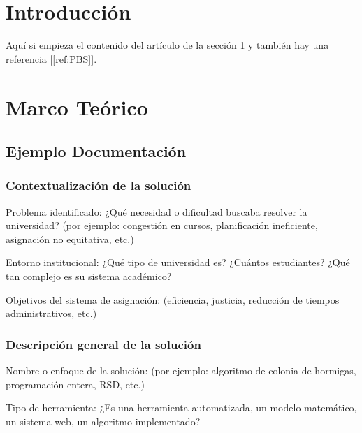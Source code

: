 \documentclass{article}
\begin{document}

\section{Introducción}\label{sec:intr}
Aquí si empieza el contenido del artículo de la sección \ref{sec:intr} y también hay una 
referencia [\ref{ref:PBS}].


\section{Marco Teórico}\label{sec:marc}

\subsection{Ejemplo Documentación}

\subsubsection{Contextualización de la solución}

Problema identificado: ¿Qué necesidad o dificultad buscaba resolver la universidad? (por ejemplo: congestión en cursos, planificación ineficiente, asignación no equitativa, etc.)

Entorno institucional: ¿Qué tipo de universidad es? ¿Cuántos estudiantes? ¿Qué tan complejo es su sistema académico?

Objetivos del sistema de asignación: (eficiencia, justicia, reducción de tiempos administrativos, etc.)

\subsubsection{Descripción general de la solución}
Nombre o enfoque de la solución: (por ejemplo: algoritmo de colonia de hormigas, programación entera, RSD, etc.)

Tipo de herramienta: ¿Es una herramienta automatizada, un modelo matemático, un sistema web, un algoritmo implementado?
\end{document}
